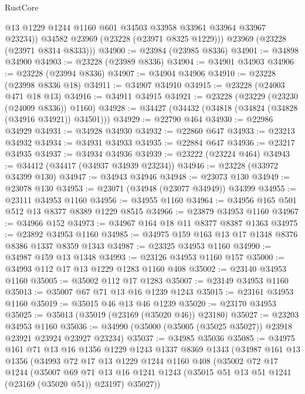\begin{lexlean}{RustCore}
\begin{coremodule}
            @13
            @1229
            @1244
            @1160
            @601
            @34503
            @33958
            @33961
            @33964
            @33967
            @23234))
        @34582
        @23969
        (@23228 (@23971 @8325 @1229)))
      @23969
      (@23228 (@23971 @8314 @8333)))
@34900 := @23984 (@23985 @8336)
@34901 := @34898 @34900
@34903 := @23228 (@23989 @8336)
@34904 := @34901 @34903
@34906 := @23228 (@23994 @8336)
@34907 := @34904 @34906
@34910 := @23228 (@23998 @8336 @18)
@34911 := @34907 @34910
@34915 := @23228 (@24003 @471 @18 @13)
@34916 := @34911 @34915
@34921 := @23228 (@23229 (@23230 (@24009 @8336)) @1160)
@34928 := @34427 (@34432 (@34818 (@34824 (@34828 (@34916 @34921)) @34501)))
@34929 := @22790 @464
@34930 := @22986 @34929
@34931 := @34928 @34930
@34932 := @22860 @647
@34933 := @23213 @34932
@34934 := @34931 @34933
@34935 := @22884 @647
@34936 := @23217 @34935
@34937 := @34934 @34936
@34939 := @23222 (@23224 @464)
@34943 := @34412 (@34417 (@34937 @34939 @23234))
@34946 := @23228 (@33972 @34399 @130)
@34947 := @34943 @34946
@34948 := @23073 @130
@34949 := @23078 @130
@34953 := @23071 (@34948 (@23077 @34949)) @34399
@34955 := @23111 @34953 @1160
@34956 := @34955 @1160
@34964 := @34956 @165 @501 @512 @13 @8377 @8389 @1229 @8515
@34966 := @23879 @34953 @1160
@34967 := @34966 @152
@34973 := @34967 @164 @18 @11 @8377 @8387 @1363
@34975 := @23892 @34953 @1160
@34985 := @34975 @159 @163 @13 @17 @1348 @8376 @8386 @1337 @8359 @1343
@34987 := @23325 @34953 @1160
@34990 := @34987 @159 @13 @1348
@34993 := @23126 @34953 @1160 @157
@35000 := @34993 @112 @17 @13 @1229 @1283 @1160 @408
@35002 := @23140 @34953 @1160
@35005 := @35002 @112 @17 @1283
@35007 := @23149 @34953 @1160
@35013 := @35007 @67 @71 @13 @16 @1239 @1243
@35015 := @23161 @34953 @1160
@35019 := @35015 @46 @13 @46 @1239
@35020 := @23170 @34953
@35025 := @35013 (@35019 (@23169 (@35020 @46)) @23180)
@35027 := @23203 @34953 @1160
@35036 := @34990 (@35000 (@35005 (@35025 @35027)) @23918 @23921 @23924 @23927 @23234)
@35037 := @34985 @35036
@35085 := @34975
    @161
    @71
    @13
    @16
    @1356
    @1229
    @1243
    @1337
    @8369
    @1343
    (@34987
      @161
      @13
      @1356
      (@34993
        @72
        @17
        @13
        @1229
        @1244
        @1160
        @408
        (@35002
          @72
          @17
          @1244
          (@35007
            @69
            @71
            @13
            @16
            @1241
            @1243
            (@35015 @51 @13 @51 @1241 (@23169 (@35020 @51)) @23197)
            @35027))

\end{coremodule}
\end{lexlean}
